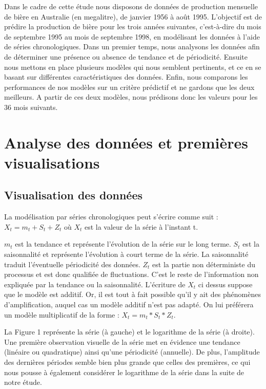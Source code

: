 \documentclass[12pt,a4paper]{book}
\newcommand{\1}{\mathds{1}}
\begin{document}
	Dans le cadre de cette étude nous disposons de données de production mensuelle de bière en Australie (en megalitre), de janvier 1956 à août 1995. L'objectif est de prédire la production de bière pour les trois années suivantes, c'est-à-dire du mois de septembre 1995 au mois de septembre 1998, en modélisant les données à l'aide de séries chronologiques.
Dans un premier temps, nous analysons les données afin de déterminer une présence ou absence de tendance et de périodicité. Ensuite nous mettons en place plusieurs modèles qui nous semblent pertinents, et ce en se basant sur différentes caractéristiques des données. Enfin, nous comparons les performances de nos modèles sur un critère prédictif et ne gardons que les deux meilleurs. A partir de ces deux modèles, nous prédisons donc les valeurs pour les 36 mois suivants.

\vspace{5 mm}


\noindent
\section{Analyse des données et premières visualisations}

\subsection{Visualisation des données}

La modélisation par séries chronologiques peut s'écrire comme suit :\\ 
$X_t = m_t + S_t + Z_t $
où $X_t$ est la valeur de la série à l'instant t.


$m_t$ est la tendance et représente l'évolution de la série sur le long terme.
$S_t$ est la saisonnalité et représente l'évolution à court terme de la série. La saisonnalité traduit l'éventuelle périodicité des données.
$Z_t$ est la partie non déterministe du processus et est donc qualifiée de fluctuations. C'est le reste de l'information non expliquée par la tendance ou la saisonnalité.
L'écriture de $X_t$ ci dessus suppose que le modèle est additif. Or, il est tout à fait possible qu'il y ait des phénomènes d'amplification, auquel cas un modèle additif n'est pas adapté. On lui préférera un modèle multiplicatif de la forme : $X_t = m_t*S_t*Z_t$.

\vspace{10 mm}
La Figure 1 représente la série (à gauche) et le logarithme de la série (à droite). \\
Une première observation visuelle de la série met en évidence une tendance (linéaire ou quadratique) ainsi qu'une périodicité (annuelle). De plus, l'amplitude des dernières périodes semble bien plus grande que celles des premières, ce qui nous pousse à également considérer le logarithme de la série dans la suite de notre étude.
\end{document}
